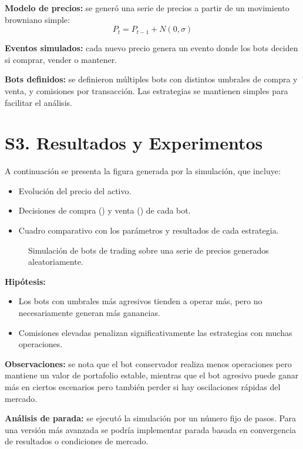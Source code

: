\documentclass[a4paper,12pt]{article}
\begin{document}
\textbf{Modelo de precios:} se generó una serie de precios a partir de un 
movimiento browniano simple:
\begin{equation*}
P_t = P_{t-1} + N(0, \sigma)
\end{equation*}

\textbf{Eventos simulados:} cada nuevo precio genera un evento donde los bots 
deciden si comprar, vender o mantener.

\textbf{Bots definidos:} se definieron múltiples bots con distintos umbrales de 
compra y venta, y comisiones por transacción. Las estrategias se mantienen 
simples para facilitar el análisis.

\section*{S3. Resultados y Experimentos}

A continuación se presenta la figura generada por la simulación, que incluye:
\begin{itemize}
\item Evolución del precio del activo.
\item Decisiones de compra (\textuparrow) y venta (\textdownarrow) de cada bot.
\item Cuadro comparativo con los parámetros y resultados de cada estrategia.
\end{itemize}

\begin{figure}[h!]
\centering
\caption{Simulación de bots de trading sobre una serie de precios generados aleatoriamente.}
\end{figure}

\textbf{Hipótesis:}
\begin{itemize}
\item Los bots con umbrales más agresivos tienden a operar más, pero no necesariamente generan más ganancias.
\item Comisiones elevadas penalizan significativamente las estrategias con muchas operaciones.
\end{itemize}

\textbf{Observaciones:} se nota que el bot conservador realiza menos operaciones 
pero mantiene un valor de portafolio estable, mientras que el bot agresivo puede 
ganar más en ciertos escenarios pero también perder si hay oscilaciones rápidas 
del mercado.

\textbf{Análisis de parada:} se ejecutó la simulación por un número fijo de 
pasos. Para una versión más avanzada se podría implementar parada basada en 
convergencia de resultados o condiciones de mercado.
\end{document}
